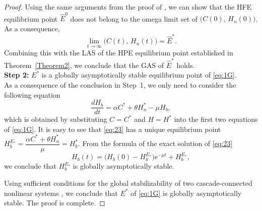 \documentclass[11pt]{article}
\theoremstyle{definition}
\theoremstyle{remark}
\numberwithin{equation}{section}
\begin{document}
\begin{proof}
Using the same arguments from the proof of \cite[Theorem~3.8]{Martcheva}, we can show that the HFE equilibrium point $\widehat{E}^0$ does not belong to the omega limit set of $\big(C(0),\,H_n(0))$. 
As a consequence,
\begin{equation*}
    \lim_{t\to\infty}\big(C(t),\,H_n(t)) = \widehat{E}^*.
\end{equation*}
Combining this with the LAS of the HPE equilibrium point established in Theorem~\ref{Theorem2}, we conclude that the GAS of $\widehat{E}^*$ holds.\\
%
\textbf{Step 2:}  $E^*$ is a globally asymptotically stable equilibrium point of \eqref{eq:1G}.\\
As a consequence of the conclusion in Step~1, we only need to consider the following equation
\begin{equation}\label{eq:23}
    \dfrac{d H_b}{dt} = \alpha C^* + \theta H_n^* - \mu H_b,
\end{equation}
which is obtained by substituting $C = C^*$ and $H = H^*$ into the first two equations of \eqref{eq:1G}.
It is easy to see that \eqref{eq:23} has a unique equilibrium point $H_b^{E_*} = \dfrac{\alpha C^* + \theta H_n^*}{\mu} = H_b^*$. From the formula of the exact solution of \eqref{eq:23}
\begin{equation*}
    H_b(t) = \bigg(H_b(0) - H_b^{E_*}\bigg)\mathrm{e}^{-\mu t} + H_b^{E_*},
\end{equation*}
we conclude that $H_b^{E_*}$ is globally asymptotically stable.

Using sufficient conditions for the global stabilizability of two cascade-connected nonlinear systems \cite{Seibert}, we conclude that $E^*$ of \eqref{eq:1G} is globally asymptotically stable. The proof is complete.
\end{proof}

\end{document}
